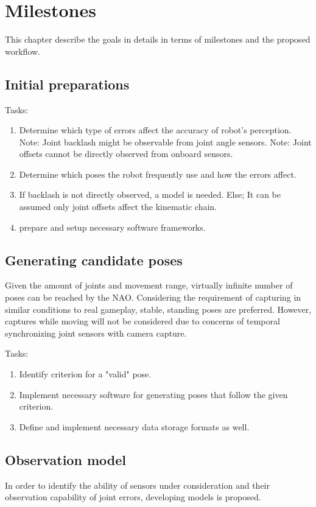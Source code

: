 \documentclass[english, printversion, nomenclature, notitle]{tuvisionthesis} %
\begin{document}
\chapter{Milestones}
\label{chap:milestones}

This chapter describe the goals in details in terms of milestones and the proposed workflow.

\section{Initial preparations}
Tasks:
\begin{enumerate}
	\item Determine which type of errors affect the accuracy of robot's perception.
	\subitem Note: Joint backlash might be observable from joint angle sensors.
	\subitem Note: Joint offsets cannot be directly observed from onboard sensors.
	\item Determine which poses the robot frequently use and how the errors affect.
	\item If backlash is not directly observed, a model is needed.
	\subitem Else; It can be assumed only joint offsets affect the kinematic chain.
	\item prepare and setup necessary software frameworks.
\end{enumerate}

\section{Generating candidate poses}
Given the amount of joints and movement range, virtually infinite number of poses can be reached by the NAO. Considering the requirement of capturing in similar conditions to real gameplay, stable, standing poses are preferred. However, captures while moving will not be considered due to concerns of temporal synchronizing joint sensors with camera capture.

Tasks:
\begin{enumerate}
	\item Identify criterion for a "valid" pose.
	\item Implement necessary software for generating poses that follow the given criterion.
	\item Define and implement necessary data storage formats as well.
\end{enumerate}

\section{Observation model}
In order to identify the ability of sensors under consideration and their observation capability of joint errors, developing  models is proposed.
\end{document}
